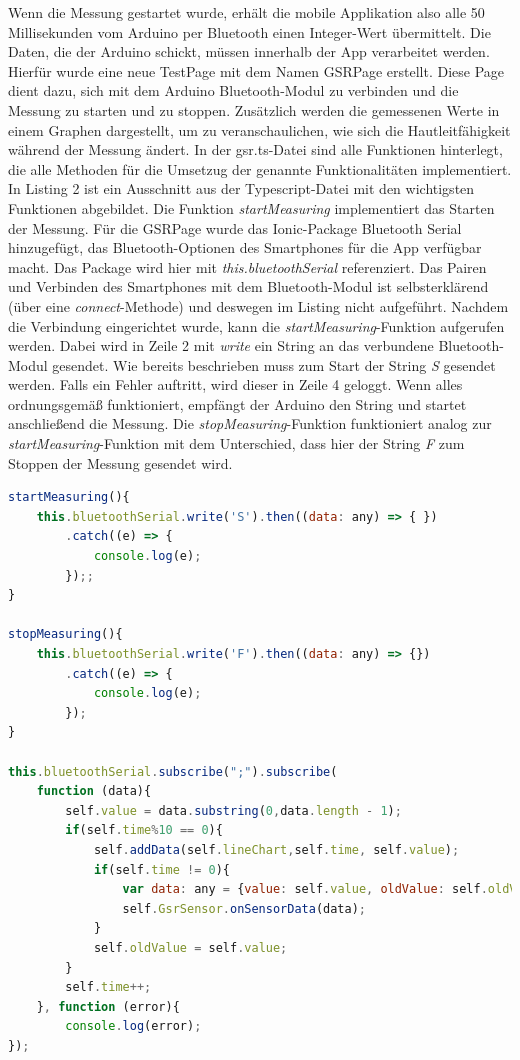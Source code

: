Wenn die Messung gestartet wurde, erhält die mobile Applikation also alle 50 Millisekunden vom Arduino per Bluetooth einen Integer-Wert übermittelt. \newline
Die Daten, die der Arduino schickt, müssen innerhalb der App verarbeitet werden. Hierfür wurde eine neue TestPage mit dem Namen GSRPage erstellt. Diese Page dient dazu, sich mit dem Arduino Bluetooth-Modul zu verbinden und die Messung zu starten und zu stoppen. Zusätzlich werden die gemessenen Werte in einem Graphen dargestellt, um zu veranschaulichen, wie sich die Hautleitfähigkeit während der Messung ändert. \newline \newline
In der gsr.ts-Datei sind alle Funktionen hinterlegt, die alle Methoden für die Umsetzug der genannte Funktionalitäten implementiert. In Listing 2 ist ein Ausschnitt aus der Typescript-Datei mit den wichtigsten Funktionen abgebildet. \newline
Die Funktion \textit{startMeasuring} implementiert das Starten der Messung. Für die GSRPage wurde das Ionic-Package Bluetooth Serial hinzugefügt, das Bluetooth-Optionen des Smartphones für die App verfügbar macht. Das Package wird hier mit \textit{this.bluetoothSerial} referenziert. Das Pairen und Verbinden des Smartphones mit dem Bluetooth-Modul ist selbsterklärend (über eine \textit{connect}-Methode) und deswegen im Listing nicht aufgeführt. Nachdem die Verbindung eingerichtet wurde, kann die \textit{startMeasuring}-Funktion aufgerufen werden. Dabei wird in Zeile 2 mit \textit{write} ein String an das verbundene Bluetooth-Modul gesendet. Wie bereits beschrieben muss zum Start der String \textit{S} gesendet werden. Falls ein Fehler auftritt, wird dieser in Zeile 4 geloggt. Wenn alles ordnungsgemäß funktioniert, empfängt der Arduino den String und startet anschließend die Messung.\newline
Die \textit{stopMeasuring}-Funktion funktioniert analog zur \textit{startMeasuring}-Funktion mit dem Unterschied, dass hier der String \textit{F} zum Stoppen der Messung gesendet wird.
\newpage
\begin{lstlisting}[caption={JS Code}, language=JavaScript]
startMeasuring(){
	this.bluetoothSerial.write('S').then((data: any) => { })
		.catch((e) => {
			console.log(e);
		});;
}

stopMeasuring(){
	this.bluetoothSerial.write('F').then((data: any) => {})
		.catch((e) => {
			console.log(e);
		});
}

this.bluetoothSerial.subscribe(";").subscribe(
	function (data){
		self.value = data.substring(0,data.length - 1);
		if(self.time%10 == 0){
			self.addData(self.lineChart,self.time, self.value);
			if(self.time != 0){
				var data: any = {value: self.value, oldValue: self.oldValue};
				self.GsrSensor.onSensorData(data);
			}  
			self.oldValue = self.value;
		}
		self.time++;
	}, function (error){
		console.log(error);
});

\end{lstlisting}
